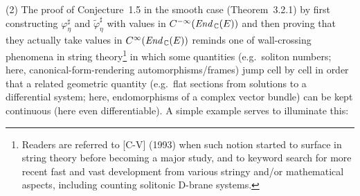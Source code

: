 \documentclass[11pt]{article}
\numberwithin{equation}{subsection}
\newcommand{\End}{\mbox{\it End}\,}
\begin{document}
 \bigskip

(2)
The proof of Conjecture~1.5 in the smooth case (Theorem~3.2.1)
    by first constructing
	     $\varphi_{\eta}^{\sharp}$ and  $\tilde{\varphi}_{\eta}^{\sharp}$
           with values in $C^{-{\infty}}(\End_{\Bbb C}(E))$  and
	     then proving that they actually take values in $C^{\infty}(\End_{\Bbb C}(E))$
 reminds one of wall-crossing phenomena in string theory\footnote{Readers
                           are referred to [C-V] (1993) when such notion started to surface in string theory
						     before  becoming a major study,
                           and to keyword search for more recent fast and vast development
						     from various stringy and/or mathematical aspects,
						     including counting solitonic D-brane systems.}
 in which  some quantities
   (e.g.\ soliton numbers;  here, canonical-form-rendering automorphisms/frames)
 jump cell by cell in order that a related geometric quantity
  (e.g.\ flat sections from solutions to a differential system;
      here, endomorphisms of a complex vector bundle)
 can be kept continuous (here even differentiable).
A simple example serves to illuminate this:

\bigskip
\end{document}
